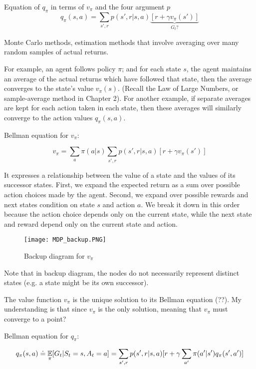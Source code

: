 \documentclass[sutton_barto_notes.tex]{subfiles}
\begin{document}
Equation of $q_\pi$ in terms of $v_\pi$ and the four argument $p$
$$ q_\pi(s,a) = \sum_{s', r} p(s',r|s,a) \underbrace{ [r+\gamma v_\pi(s')] }_{G_t?} $$

\begin{definition}
Monte Carlo methods, estimation methods that involve averaging over many random samples of actual returns.
\end{definition}

For example, an agent follows policy $\pi$; and for each state $s$, the agent maintains an average of the actual returns which have followed that state, then the average converges to the state's value $v_\pi(s)$. (Recall the Law of Large Numbers, or sample-average method in Chapter 2).
For another example, if separate averages are kept for each action taken in each state, then these averages will similarly converge to the action values $q_\pi(s,a)$.

\begin{definition}
Bellman equation for $v_\pi$:

$$ v_\pi = \sum_a \pi(a|s) \sum_{s',r} p(s',r|s,a) [r+ \gamma v_\pi(s')] $$
\end{definition}

It expresses a relationship between the value of a state and the values of its successor states. First, we expand the expected return as a sum over possible action choices made by the agent. Second, we expand over possible rewards and next states condition on state $s$ and action $a$. We break it down in this order because the action choice depends only on the current state, while the next state and reward depend only on the current state and action. 

\begin{figure}[!h]
  \centering
  \texttt{[image: MDP\_backup.PNG]}
  \caption{Backup diagram for $v_\pi$}
  \label{fig:MDP_backup}
\end{figure}
Note that in backup diagram, the nodes do not necessarily represent distinct states (e.g. a state might be its own successor).

The value function $v_\pi$ is the unique solution to its Bellman equation (??). My understanding is that since $v_\pi$ is the only solution, meaning that $v_\pi$ must converge to a point?

\begin{definition}
Bellman equation for $q_\pi$:

$$ q_\pi(s,a) \doteq \operatorname*{\mathbb{E}}_\pi [G_t | S_t = s, A_t = a] = \sum_{s',r} p(s',r|s,a)[r+\gamma \sum_{a'} \pi(a'|s')q_\pi (s',a')] $$
\end{definition}
\end{document}
